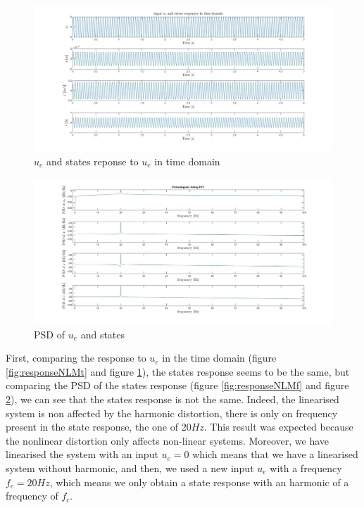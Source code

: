 \begin{figure}[H]
\includegraphics[scale=.3]{figures/responseLMt.jpg}
\caption{$u_e$ and states reponse to $u_e$ in time domain}
\label{fig:responseLMt}
\end{figure}
\begin{figure}[H]
\includegraphics[scale=.3]{figures/responseLMf.jpg}
\caption{PSD of $u_e$ and states}
\label{fig:responseLMf}
\end{figure}

First, comparing the response to $u_e$ in the time domain (figure \ref{fig:responseNLMt} and figure \ref{fig:responseLMt}), the states response seems to be the same, but comparing the PSD of the states response (figure \ref{fig:responseNLMf} and figure \ref{fig:responseLMf}), we can see that the states response is not the same. Indeed, the linearised system is non affected by the harmonic distortion, there is only on frequency present in the state response, the one of 20$Hz$.
This result was expected because the nonlinear distortion only affects non-linear systems. Moreover, we have linearised the system with an input $u_e=0$ which means that we have a linearised system without harmonic, and then, we used a new input $u_e$ with a frequency $f_c=20Hz$, which means we only obtain a state response with an harmonic of a frequency of $f_c$.





